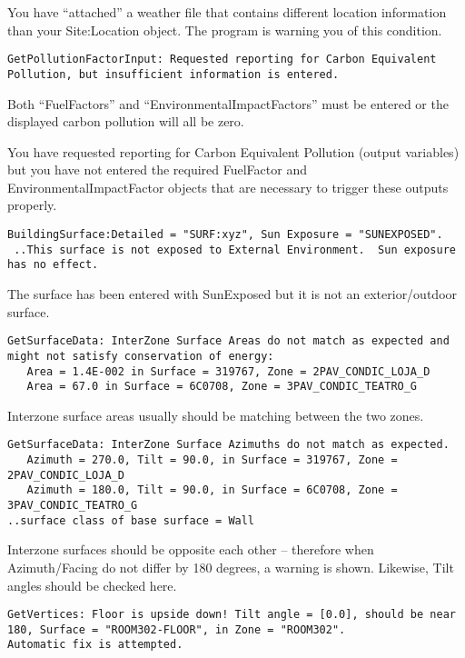 You have ``attached'' a weather file that contains different location information than your Site:Location object. The program is warning you of this condition.

\begin{lstlisting}
GetPollutionFactorInput: Requested reporting for Carbon Equivalent Pollution, but insufficient information is entered.
\end{lstlisting}

Both ``FuelFactors'' and ``EnvironmentalImpactFactors'' must be entered or the displayed carbon pollution will all be zero.

You have requested reporting for Carbon Equivalent Pollution (output variables) but you have not entered the required FuelFactor and EnvironmentalImpactFactor objects that are necessary to trigger these outputs properly.

\begin{lstlisting}
BuildingSurface:Detailed = "SURF:xyz", Sun Exposure = "SUNEXPOSED".
 ..This surface is not exposed to External Environment.  Sun exposure has no effect.
\end{lstlisting}

The surface has been entered with SunExposed but it is not an exterior/outdoor surface.

\begin{lstlisting}
GetSurfaceData: InterZone Surface Areas do not match as expected and might not satisfy conservation of energy:
   Area = 1.4E-002 in Surface = 319767, Zone = 2PAV_CONDIC_LOJA_D
   Area = 67.0 in Surface = 6C0708, Zone = 3PAV_CONDIC_TEATRO_G
\end{lstlisting}

Interzone surface areas usually should be matching between the two zones.

\begin{lstlisting}
GetSurfaceData: InterZone Surface Azimuths do not match as expected.
   Azimuth = 270.0, Tilt = 90.0, in Surface = 319767, Zone = 2PAV_CONDIC_LOJA_D
   Azimuth = 180.0, Tilt = 90.0, in Surface = 6C0708, Zone = 3PAV_CONDIC_TEATRO_G
..surface class of base surface = Wall
\end{lstlisting}

Interzone surfaces should be opposite each other -- therefore when Azimuth/Facing do not differ by 180 degrees, a warning is shown. Likewise, Tilt angles should be checked here.

\begin{lstlisting}
GetVertices: Floor is upside down! Tilt angle = [0.0], should be near 180, Surface = "ROOM302-FLOOR", in Zone = "ROOM302".
Automatic fix is attempted.
\end{lstlisting}

